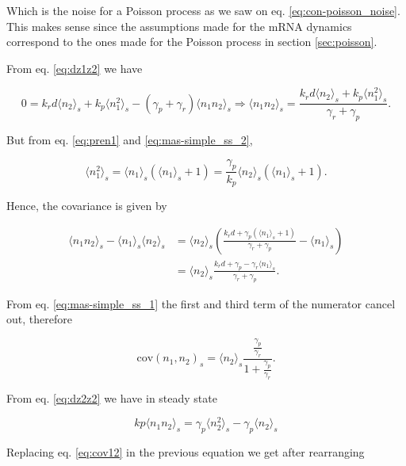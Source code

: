 Which is the noise for a Poisson process as we saw on eq. \eqref{eq:con-poisson_noise}. This makes sense since the assumptions made for the mRNA dynamics correspond to the ones made for the Poisson process in section \ref{sec:poisson}.


From eq. \eqref{eq:dz1z2} we have

\begin{equation*}
  0 = k_rd \langle n_2 \rangle_s + k_p \langle n_1^2 \rangle_s - (\gamma_p + \gamma_r) \langle n_1n_2 \rangle_s \Rightarrow \langle n_1n_2 \rangle_s  = \frac{k_rd\langle n_2\rangle_s+k_p\langle n_1^2\rangle_s}{\gamma_r+\gamma_p}.
\end{equation*}

But from eq. \eqref{eq:pren1} and \eqref{eq:mas-simple_ss_2},

\begin{equation}
\langle n_1^2 \rangle_s = \langle n_1 \rangle_s\left( \langle n_1 \rangle_s+1\right) = \frac{\gamma_p}{k_p}\langle n_2 \rangle_s\left(\langle n_1\rangle_s + 1\right).
\end{equation}

Hence, the covariance is given by

\begin{align*}
  \langle n_1n_2 \rangle_s - \langle n_1 \rangle_s\langle n_2\rangle_s &= \langle n_2 \rangle_s \left(\frac{k_rd+\gamma_p\left(\langle n_1\rangle_s+1\right)}{\gamma_r+\gamma_p}-\langle n_1\rangle_s\right)\\
  &=\langle n_2\rangle_s\frac{k_rd+\gamma_p-\gamma_r\langle n_1\rangle_s}{\gamma_r+\gamma_p}.
\end{align*}

From eq. \eqref{eq:mas-simple_ss_1} the first and third term of the numerator cancel out, therefore

\begin{equation}
  \label{eq:cov12}
  \boxed{\text{cov}(n_1,n_2)_s = \langle n_2 \rangle_s\frac{\frac{\gamma_p}{\gamma_r}}{1+\frac{\gamma_p}{\gamma_r}}}.
\end{equation}

From eq. \ref{eq:dz2z2} we have in steady state

\begin{equation*}
kp\langle n_1n_2\rangle_s = \gamma_p\langle n_2^2\rangle_s-\gamma_p\langle n_2\rangle_s
\end{equation*}

Replacing eq. \ref{eq:cov12} in the previous equation we get after rearranging

